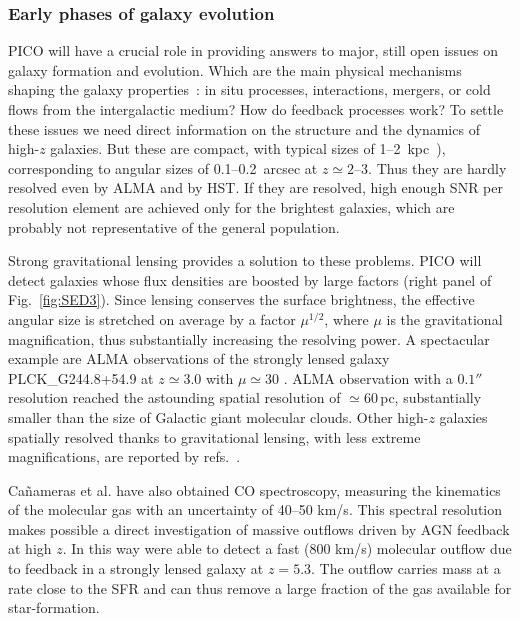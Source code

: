 \documentclass[PICOReport.tex]{subfiles}
\begin{document}
\subsubsection{Early phases of galaxy evolution}

PICO will have a crucial role in providing answers to major, still open issues on galaxy formation and evolution. Which are the main physical mechanisms shaping the galaxy properties~\citep{SilkMamon2012, SomervilleDave2015}: in situ processes, interactions, mergers, or cold flows  from the intergalactic medium? How do feedback processes work? To settle these issues we need direct information on the structure and the dynamics of high-$z$ galaxies. But these are compact, with typical sizes of 1--2~kpc~\cite{Fujimoto2018}), corresponding to angular sizes of 0.1--0.2~arcsec at $z\simeq 2$--3. Thus they are hardly resolved even by ALMA and by HST. If they are resolved, high enough \ac{SNR} per resolution element are achieved only for the brightest galaxies, which are probably not representative of the general population.

Strong gravitational lensing provides a solution to these problems. PICO will detect galaxies whose flux densities are boosted by large factors (right panel of Fig.~\ref{fig:SED3}). Since lensing conserves the surface brightness, the effective angular size is stretched on average by a factor $\mu^{1/2}$, where $\mu$ is the gravitational magnification, thus substantially increasing the resolving power. A spectacular example are ALMA observations of the strongly lensed galaxy PLCK\_G244.8\-+54.9 at $z \simeq 3.0$  with $\mu \simeq 30$ \cite{Canameras2017ALMA}. ALMA observation with a $0.1''$ resolution reached the astounding spatial resolution of $\simeq 60\,$pc, substantially smaller than the size of Galactic giant molecular clouds. Other high-$z$ galaxies spatially resolved thanks to gravitational lensing, with less extreme magnifications, are reported by refs.~\cite{Dye2018, Lamarche2018, Sharda2018}.

Ca\~{n}ameras et al. \cite{Canameras2017ALMA} have also obtained CO spectroscopy, measuring the kinematics of the molecular gas with an uncertainty of 40--50 km/s. This spectral resolution makes possible a direct investigation of massive outflows driven by AGN feedback at high $z$. In this way \citet{Spilker2018} were able to detect a fast (800 km/s) molecular outflow due to feedback in a strongly lensed galaxy at $z=5.3$. The outflow carries mass at a rate close to the SFR and can thus remove a large fraction of the gas available for star-formation.
\end{document}
